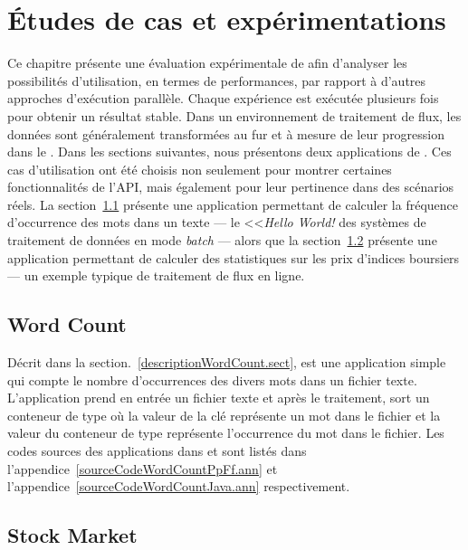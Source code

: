 
\chapter{\'Etudes de cas et exp\'erimentations}
\label{experiences.chap}

Ce chapitre pr\'esente une \'evaluation exp\'erimentale de  afin d'analyser les possibilit\'es d'utilisation, en termes de performances, par rapport \`a d'autres approches d'ex\'ecution parall\`ele. Chaque exp\'erience est ex\'ecut\'ee plusieurs fois pour obtenir un r\'esultat stable. Dans un environnement de traitement de flux, les donn\'ees sont g\'en\'eralement transform\'ees au fur et \`a mesure de leur progression dans le . Dans les sections suivantes, nous pr\'esentons deux applications de . Ces cas d'utilisation ont \'et\'e choisis non seulement pour montrer certaines fonctionnalit\'es de l'API, mais \'egalement pour leur pertinence dans des sc\'enarios r\'eels. La section~\ref{wordcount.sect} pr\'esente une application permettant de calculer la fr\'equence d'occurrence des mots dans un texte --- le <<\emph{Hello World!} des syst\`emes de traitement de donn\'ees en mode \emph{batch} --- alors que la section~\ref{stockprice.sect} pr\'esente une application permettant de calculer des statistiques sur les prix d'indices boursiers --- un exemple typique de traitement de flux en ligne.


\section{Word Count}
\label{wordcount.sect}

D\'ecrit dans la section.~\ref{descriptionWordCount.sect},  est une application simple qui compte le nombre d'occurrences des divers mots dans un fichier texte. L'application prend en entr\'ee un fichier texte et apr\`es le traitement, sort un conteneur de type  où la valeur de la cl\'e repr\'esente un mot dans le fichier et la valeur du conteneur de type  repr\'esente l'occurrence du mot dans le fichier. Les codes sources des applications  dans  et  sont list\'es dans l'appendice~\ref{sourceCodeWordCountPpFf.ann} et l'appendice~\ref{sourceCodeWordCountJava.ann} respectivement.



\section{Stock Market}
\label{stockprice.sect}
